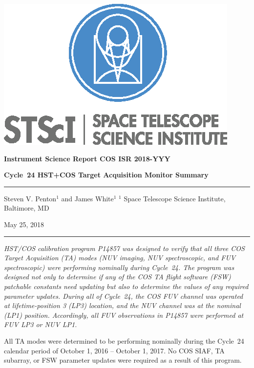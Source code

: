 \documentclass[12pt]{reportj}
\newcommand{\pid}[1]{{\rm P}#1}
\newcommand{\thisISR}[1]{COS ISR 2018-YYY}
\begin{document}
\vspace{-2.5cm}
\noindent\includegraphics*[width=0.295\linewidth]{new_st_logo.eps}

\vspace{-0.5cm}

\begin{flushright}
{\bf Instrument Science Report \thisISR{}}

\vspace{1.0cm}
{\bf\Huge Cycle~24 HST+COS Target Acquisition Monitor Summary}

\rule{0.25\linewidth}{0.5pt}

\vspace{0.4cm}
Steven V. Penton$^1$ and James White$^1$
\linebreak
\newline
\footnotesize{$^1$ Space Telescope Science Institute, Baltimore, MD}
\vspace{0.5cm}

May 25, 2018
\end{flushright}
\vspace{-0.3cm}
\noindent\rule{\linewidth}{1.0pt}

{\it \noindent
HST/COS calibration program \pid{14857} was designed to verify that all three COS Target Acquisition (TA) modes (NUV imaging, NUV spectroscopic, and FUV spectroscopic)
 were performing nominally during Cycle~24. The program was designed not only to determine if any of the COS TA flight software (FSW) patchable constants need updating but also to determine the values of any required parameter updates.
During all of Cycle~24, the COS FUV channel was operated at lifetime-position 3 (LP3) location, and the NUV channel was at the nominal (LP1) position. Accordingly, all FUV observations in \pid{14857} were performed at FUV LP3 or NUV LP1.

All TA modes were determined to be performing nominally during the Cycle~24 calendar period of October 1, 2016 -- October 1, 2017. No COS SIAF, TA subarray, or FSW parameter updates were required as a result of this program. }
\end{document}
